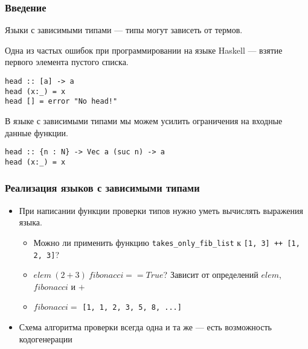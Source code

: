
\begin{frame}[fragile]
\frametitle{Введение}

Языки с зависимыми типами --- типы могут зависеть от термов.

Одна из частых ошибок при программировании на языке Haskell --- взятие первого элемента пустого списка.

\begin{verbatim}
head :: [a] -> a
head (x:_) = x
head [] = error "No head!"
\end{verbatim}

В языке с зависимыми типами мы можем усилить ограничения на входные данные функции.

\begin{verbatim}
head :: {n : N} -> Vec a (suc n) -> a
head (x:_) = x
\end{verbatim}

\end{frame}

\begin{frame}
\frametitle{Реализация языков с зависимыми типами}

\begin{itemize}
\item При написании функции проверки типов нужно уметь вычислять выражения языка.
  \begin{itemize}
    \item Можно ли применить функцию \lstinline{takes_only_fib_list} к \lstinline{[1, 3] ++ [1, 2, 3]}?
    \item $elem\ (2 + 3)\ fibonacci == True$? Зависит от определений $elem$, $fibonacci$ и $+$
    \item $fibonacci =$ \lstinline{[1, 1, 2, 3, 5, 8, ...]}
  \end{itemize}
\item Схема алгоритма проверки всегда одна и та же --- есть возможность кодогенерации

\end{itemize}

\end{frame}


